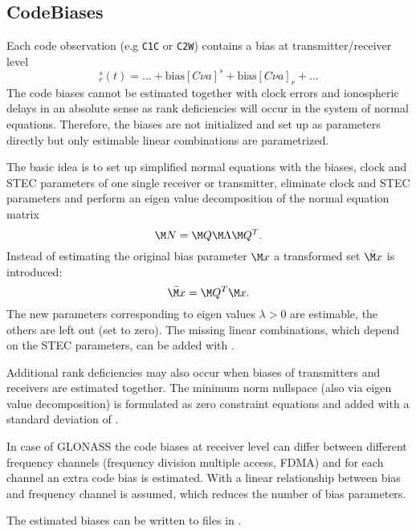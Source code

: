 \subsection{CodeBiases}\label{gnssParametrizationType:codeBiases}
Each code observation (e.g \verb|C1C| or \verb|C2W|) contains a bias at transmitter/receiver level
\begin{equation}
  [C\nu a]_r^s(t) = \dots + \text{bias}[C\nu a]^s + \text{bias}[C\nu a]_r + \dots
\end{equation}
The code biases cannot be estimated together with clock errors and ionospheric delays in an absolute sense
as rank deficiencies will occur in the system of normal equations. Therefore, the biases are not initialized and set up
as parameters directly but only estimable linear combinations are parametrized.

The basic idea is to set up simplified normal equations with the biases,
clock and STEC parameters of one single receiver or transmitter,
eliminate clock and STEC parameters and perform an eigen value decomposition
of the normal equation matrix
\begin{equation}
  \M N = \M Q \M\Lambda \M Q^T.
\end{equation}
Instead of estimating the original bias parameter $\M x$ a transformed set $\bar{\M x}$
is introduced:
\begin{equation}
  \bar{\M x} = \M Q^T \M x.
\end{equation}
The new parameters corresponding to eigen values $\lambda>0$ are estimable,
the others are left out (set to zero). The missing linear combinations,
which depend on the STEC parameters, can be added with
.

Additional rank deficiencies may also occur when biases of transmitters and receivers are estimated together.
The minimum norm nullspace (also via eigen value decomposition)
is formulated as zero constraint equations and added with a standard deviation of .

In case of GLONASS the code biases at receiver level can differ between different frequency channels
(frequency division multiple access, FDMA) and for each channel an extra code bias is estimated.
With  a linear relationship between bias and frequency channel is assumed,
which reduces the number of bias parameters.

The estimated biases can be written to files in
.


